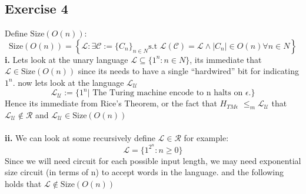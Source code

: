 \documentclass[12pt]{article}
\begin{document}
\subsection*{Exercise 4}
Define $\text{Size}(O(n))$: \[
\text{Size}(O(n)) = \left\lbrace
\mathcal{L} :\exists \mathcal{C}:=\{C_n\}_{n\in N}\text{
s.t } \mathcal{L(C)=L} \wedge |C_n|\in O(n)  \forall n\in N
\right\rbrace
\]
\textbf{i. } Lets look at the unary language 
$\mathcal{L} \subseteq \{1^n: n \in N \}$, its immediate  that $\mathcal{L}\in\text{Size}(O(n)) $ since its needs to have a single “hardwired”
bit for indicating $1^n$. now lets look at the language $\mathcal{L_U}$
\[ \mathcal{L_U} := \{1^
n | \text{ The Turing machine encode to n halts on $\epsilon$.}\}
\]
Hence its immediate from Rice’s Theorem, or the fact that $
H_{TM\epsilon}$ $\leq_m \mathcal{L_U}$
that $\mathcal{L_U} \notin \mathcal{R}$ and $\mathcal{L_U}\in\text{Size}(O(n)) $
\\\\\textbf{ii. } We can look at some recursively   define $\mathcal{L}\in \mathcal{R}$ for example: \[
\mathcal{L} =\{1^{2^n} : n\geq0 \}
\] Since we will need circuit for each possible input length, we  may need exponential size circuit (in terms of n) to accept words in the  language.  and the following holds that $\mathcal{L} \notin \text{Size}(O(n)) $
\end{document}
